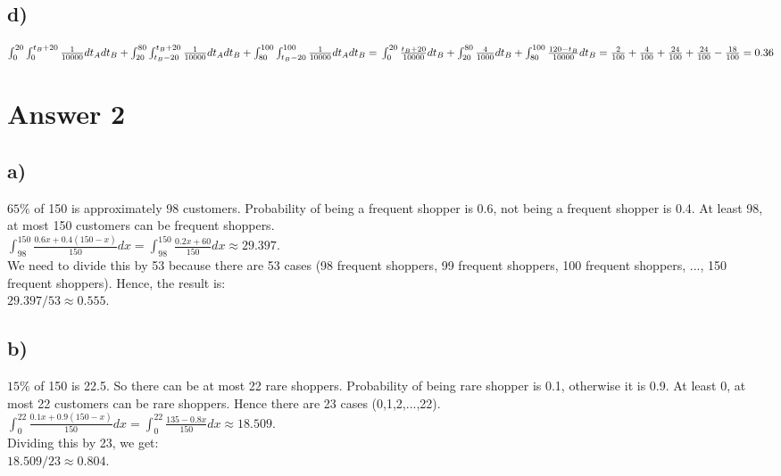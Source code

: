 \documentclass[12pt]{article}
\begin{document}
\subsection*{d)} 
$ \int_{0}^{20} \int_{0}^{t_B+20} \frac{1}{10000} dt_Adt_B + \int_{20}^{80} \int_{t_B-20}^{t_B+20} \frac{1}{10000} dt_Adt_B + \int_{80}^{100} \int_{t_B-20}^{100} \frac{1}{10000} dt_Adt_B =\vspace{0.2cm}\\
\int_{0}^{20} \frac{t_B+20}{10000} dt_B + \int_{20}^{80} \frac{4}{1000} dt_B + \int_{80}^{100} \frac{120-t_B}{10000} dt_B = \frac{2}{100} + \frac{4}{100} + \frac{24}{100} + \frac{24}{100} - \frac{18}{100} = 0.36  $

\section*{Answer 2}

\subsection*{a)} 
$65\%$ of 150 is approximately 98 customers. Probability of being a frequent shopper is 0.6, not being a frequent shopper is 0.4. At least 98, at most 150 customers can be frequent shoppers.\vspace{0.3cm}\\
$ \int_{98}^{150} \frac{0.6x+0.4(150-x)}{150}dx = \int_{98}^{150} \frac{0.2x+60}{150}dx \approx 29.397. $\vspace{0.3cm}\\
We need to divide this by 53 because there are 53 cases (98 frequent shoppers, 99 frequent shoppers, 100 frequent shoppers, ..., 150 frequent shoppers). Hence, the result is:\\
$29.397 / 53 \approx 0.555.$
\subsection*{b)} 
$15\%$ of 150 is 22.5. So there can be at most 22 rare shoppers. Probability of being rare shopper is 0.1, otherwise it is 0.9. At least 0, at most 22 customers can be rare shoppers. Hence there are 23 cases (0,1,2,...,22).\vspace{0.3cm}\\
$ \int_{0}^{22} \frac{0.1x+0.9(150-x)}{150}dx = \int_{0}^{22} \frac{135-0.8x}{150}dx \approx 18.509. $\vspace{0.3cm}\\
Dividing this by 23, we get:\\
$18.509 / 23 \approx 0.804.$
\end{document}
